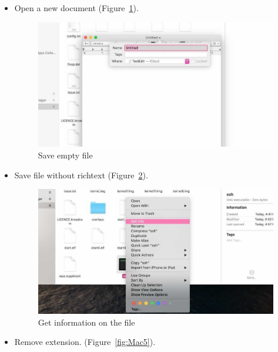 \documentclass{article}
\begin{document}
\begin{enumerate}
\begin{itemize}
\begin{itemize}
  \item Open a new document (Figure~\ref{fig:Mac3}).

\begin{figure}[h]
\centering
\includegraphics[width=1.0\textwidth]{1_MACtext_3}
\caption{Save empty file}
\label{fig:Mac3}
\end{figure}
  \item Save file without richtext (Figure~\ref{fig:Mac4}).

\begin{figure}[h]
\centering
\includegraphics[width=1.0\textwidth]{1_MACtext_4}
\caption{Get information on the file}
\label{fig:Mac4}
\end{figure}

  \item Remove extension. (Figure~\ref{fig:Mac5}).


\end{itemize}
\end{itemize}
\end{enumerate}
\end{document}
